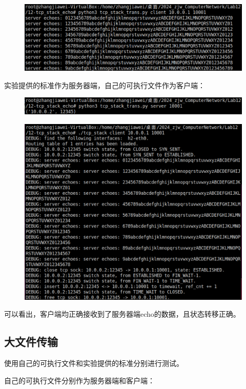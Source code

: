 \documentclass[UTF8]{report}
\begin{document}
\begin{figure}[H]
    \centering
    \includegraphics[width=.75\textwidth]{my_server_std_client_echo_h2.png}
\end{figure}

实验提供的标准作为服务器端，自己的可执行文件作为客户端：

\begin{figure}[H]
    \centering
    \includegraphics[width=.75\textwidth]{std_server_my_client_echo_h1.png}
\end{figure}

\begin{figure}[H]
    \centering
    \includegraphics[width=.75\textwidth]{std_server_my_client_echo_h2.png}
\end{figure}

可以看出，客户端均正确接收到了服务器端echo的数据，且状态转移正确。

\subsection{大文件传输}

使用自己的可执行文件和实验提供的标准分别进行测试。

自己的可执行文件分别作为服务器端和客户端：
\end{document}
